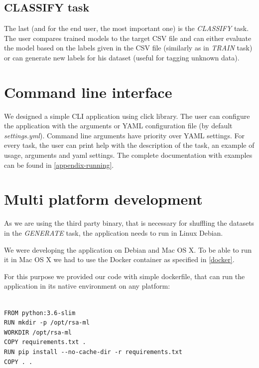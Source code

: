 \subsection{CLASSIFY task}

The last (and for the end user, the most important one) is the \textit{CLASSIFY} task. The user compares trained models to the target CSV file and can either evaluate the model based on the labels given in the CSV file (similarly as in \textit{TRAIN} task) or can generate new labels for his dataset (useful for tagging unknown data).

\section{Command line interface}
\label{cli}

We designed a simple CLI application using click library. The user can configure the application with the arguments or YAML configuration file (by default \textit{settings.yml}). Command line arguments have priority over YAML settings. For every task, the user can print help with the description of the task, an example of usage, arguments and yaml settings. The complete documentation with examples can be found in \autoref{appendix-running}.

\section{Multi platform development}

As we are using the third party binary, that is necessary for shuffling the datasets in the \textit{GENERATE} task, the application needs to run in Linux Debian.

We were developing the application on Debian and Mac OS X. To be able to run it in Mac OS X we had to use the Docker container as specified in \autoref{docker}.

For this purpose we provided our code with simple dockerfile, that can run the application in its native environment on any platform:

\begin{verbatim}

FROM python:3.6-slim
RUN mkdir -p /opt/rsa-ml
WORKDIR /opt/rsa-ml
COPY requirements.txt .
RUN pip install --no-cache-dir -r requirements.txt
COPY . .

\end{verbatim}

